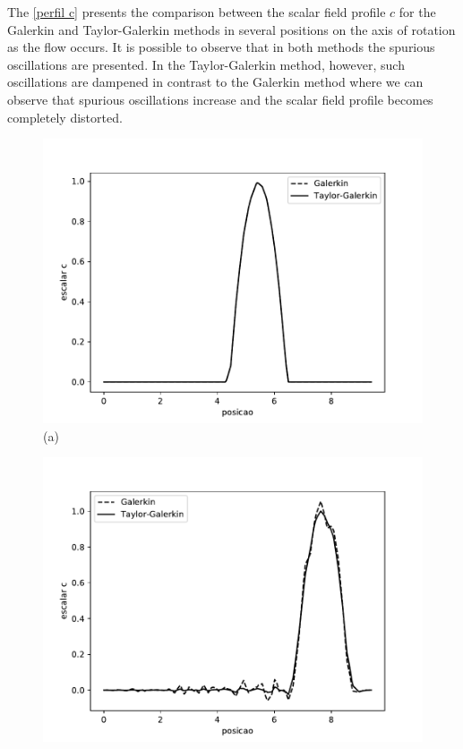 \medskip
The \ref{perfil c} presents the comparison between the scalar field
profile $c$ for the Galerkin and Taylor-Galerkin methods in 
several positions on the axis of rotation as the flow occurs. 
It is possible to observe that in both methods the spurious oscillations 
are presented. In the Taylor-Galerkin method, however, 
such oscillations are dampened in contrast to the Galerkin method 
where we can observe that spurious oscillations increase and 
the scalar field profile becomes completely distorted.

\begin{center}
\begin{figure}[H]
     \centering
     \begin{minipage}{.5\linewidth}
      \centering
      \includegraphics[scale=0.53]{./02_chaps/cap_validation/figure/convection_0.pdf}\\
      (a)
     \end{minipage}%
     \begin{minipage}{.5\linewidth}
      \centering
      \includegraphics[scale=0.53]{./02_chaps/cap_validation/figure/convection_300.pdf}\\

\end{minipage}
\end{figure}
\end{center}
